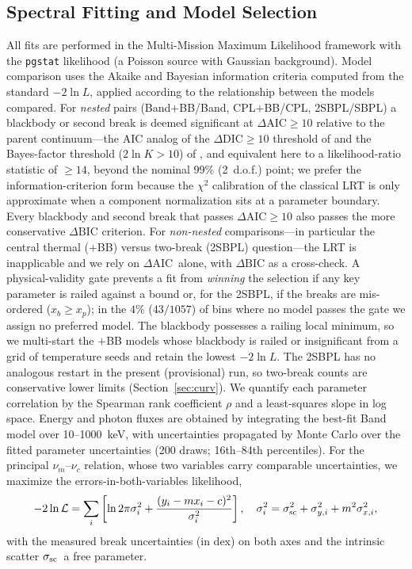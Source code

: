 \documentclass[twocolumn]{aastex631}
\newcommand{\nuc}{\ensuremath{\nu_c}}
\newcommand{\num}{\ensuremath{\nu_m}}
\newcommand{\daic}{\ensuremath{\Delta\mathrm{AIC}}}
\newcommand{\ssc}{\ensuremath{\sigma_{\rm sc}}}
\begin{document}
\subsection{Spectral Fitting and Model Selection} \label{sec:fit}
All fits are performed in the Multi-Mission Maximum Likelihood framework
\citep[3ML;][]{Vianello2015} with the \texttt{pgstat} likelihood (a Poisson
source with Gaussian background). Model comparison uses the Akaike and Bayesian
information criteria \citep[AIC, BIC;][]{Akaike1974,Schwarz1978} computed from
the standard $-2\ln L$, applied according to the relationship between the models
compared. For \emph{nested} pairs (Band$+$BB/Band, CPL$+$BB/CPL, 2SBPL/SBPL) a
blackbody or second break is deemed significant at $\daic\ge10$ relative to the
parent continuum---the AIC analog of the $\Delta\mathrm{DIC}\ge10$ threshold of
\citet{Li2021} and the Bayes-factor threshold ($2\ln K>10$) of
\citet{Burgess2019}, and equivalent here to a likelihood-ratio statistic
\citep{Wilks1938} of $\ge$$14$, beyond the nominal 99\% (2~d.o.f.) point; we
prefer the information-criterion form because the $\chi^2$ calibration of the
classical LRT is only approximate when a component normalization sits at a
parameter boundary. Every blackbody and second break that passes $\daic\ge10$
also passes the more conservative $\Delta\mathrm{BIC}$ criterion. For
\emph{non-nested} comparisons---in particular the central thermal
($+$BB) versus two-break (2SBPL) question---the LRT is inapplicable and we rely
on \daic\ alone, with $\Delta\mathrm{BIC}$ as a cross-check. A physical-validity
gate prevents a fit from \emph{winning} the selection if any key parameter is
railed against a bound or, for the 2SBPL, if the breaks are mis-ordered
($x_b\ge x_p$); in the $4\%$ ($43/1057$) of bins where no model passes the gate
we assign no preferred model. The blackbody possesses a railing local minimum,
so we multi-start the $+$BB models whose blackbody is railed or insignificant
from a grid of temperature seeds and retain the lowest $-2\ln L$. The 2SBPL has
no analogous restart in the present (provisional) run, so two-break counts are
conservative lower limits (Section~\ref{sec:curv}). We quantify each parameter
correlation by the Spearman rank coefficient $\rho$ and a least-squares slope in
log space. Energy and photon fluxes are obtained by integrating the best-fit
Band model over 10--1000~keV, with uncertainties propagated by Monte Carlo over
the fitted parameter uncertainties (200 draws; 16th--84th percentiles). For the
principal $\num$--$\nuc$ relation, whose two variables carry comparable
uncertainties, we maximize the \citet{DAgostini2005} errors-in-both-variables
likelihood,
\begin{equation}
-2\ln\mathcal{L}=\sum_i\left[\ln 2\pi\sigma_i^2
+\frac{(y_i-m x_i-c)^2}{\sigma_i^2}\right],\quad
\sigma_i^2=\ssc^2+\sigma_{y,i}^2+m^2\sigma_{x,i}^2,
\label{eq:dagostini}
\end{equation}
with the measured break uncertainties (in dex) on both axes and the intrinsic
scatter \ssc\ a free parameter.
\end{document}
